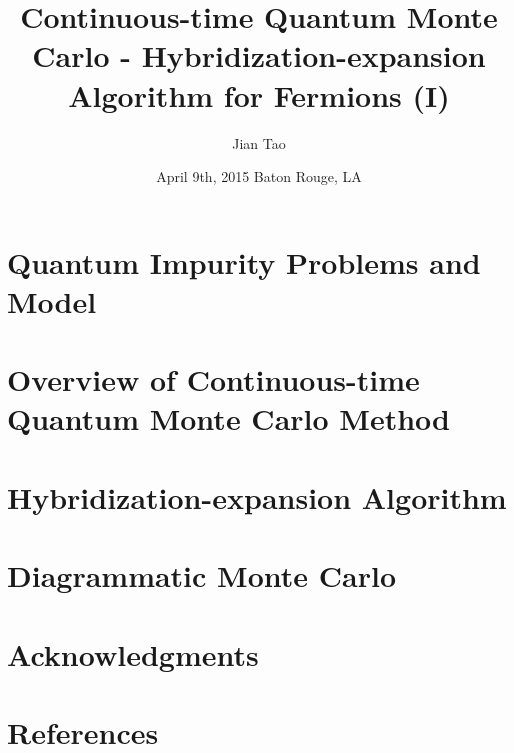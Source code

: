 
\title[TESC Seminar]{Continuous-time Quantum Monte Carlo - Hybridization-expansion Algorithm for Fermions (I)}
\author[Jian Tao]{Jian Tao}
\date{April 9th, 2015 Baton Rouge, LA}

\frame{\titlepage}

\section[Outline]{}
  \frame{\tableofcontents}
\section{Quantum Impurity Problems and Model}
  
\section{Overview of Continuous-time Quantum Monte Carlo Method}
    
\section{Hybridization-expansion Algorithm}
  
\section{Diagrammatic Monte Carlo}
    
\section{Acknowledgments}
  
\section{References}
  


